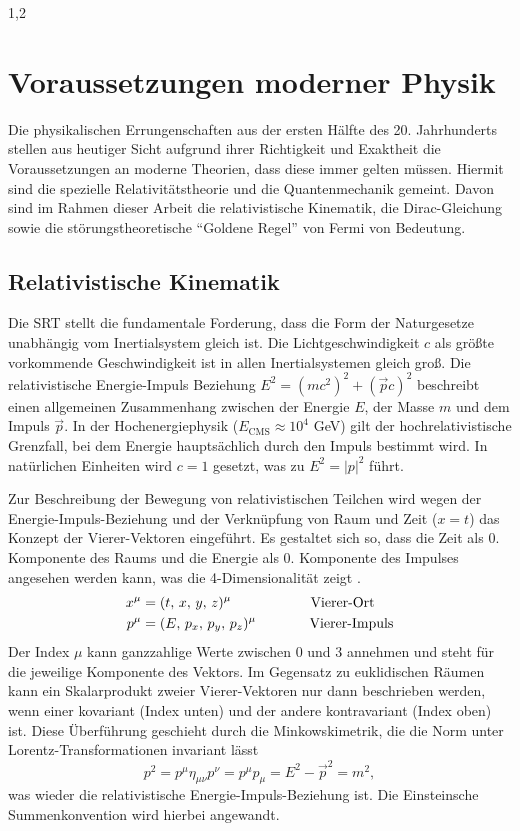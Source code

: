 \documentclass[11pt,a4paper,twoside]{report}
\begin{document}
\begin{spacing}{1,2}
\section{Voraussetzungen moderner Physik}
Die physikalischen Errungenschaften aus der ersten Hälfte des 20. Jahrhunderts stellen aus heutiger Sicht aufgrund ihrer Richtigkeit und Exaktheit die 
Voraussetzungen an moderne 
Theorien, dass diese immer gelten müssen. Hiermit sind die spezielle Relativitätstheorie und die Quantenmechanik gemeint. Davon sind im Rahmen dieser 
Arbeit die relativistische Kinematik, die Dirac-Gleichung sowie die störungstheoretische ``Goldene Regel'' von Fermi
von Bedeutung.

\subsection{Relativistische Kinematik}
Die SRT stellt die fundamentale Forderung, dass die Form der Naturgesetze unabhängig vom Inertialsystem gleich ist. Die Lichtgeschwindigkeit $c$ als
größte vorkommende Geschwindigkeit ist in allen Inertialsystemen gleich groß. Die relativistische Energie-Impuls Beziehung 
$E^2 = \left(mc^2\right)^2 + \left(\vec pc\right)^2$ beschreibt einen allgemeinen Zusammenhang zwischen der Energie $E$, der Masse $m$ und dem Impuls $\vec p$.
In der Hochenergiephysik ($E_{\text{CMS}} \approx 10^4$ GeV) gilt der hochrelativistische Grenzfall, bei dem Energie hauptsächlich durch den Impuls bestimmt wird.
In natürlichen Einheiten wird $c = 1$ gesetzt, was zu $E^2 = \left|p\right|^2$ führt.

Zur Beschreibung der Bewegung von relativistischen Teilchen wird wegen der Energie-Impuls-Beziehung und der Verknüpfung von Raum und Zeit ($x = t$) das Konzept
der Vierer-Vektoren eingeführt. Es gestaltet sich so, dass die Zeit als 0. Komponente des Raums und die Energie als 0. Komponente des Impulses angesehen werden
kann, was die 4-Dimensionalität zeigt \cite{RelKin}.
\begin{align}
 x^\mu &= (t,\,x,\,y,\,z)^\mu \hspace{2cm} \text{Vierer-Ort}\\
 p^\mu &= (E,\,p_x,\,p_y,\,p_z)^\mu \hspace{1.35cm} \text{Vierer-Impuls}
\end{align}
Der Index $\mu$ kann ganzzahlige Werte zwischen 0 und 3 annehmen und steht für die jeweilige Komponente des Vektors. Im Gegensatz zu euklidischen Räumen 
kann ein Skalarprodukt zweier Vierer-Vektoren nur dann beschrieben werden, wenn einer kovariant (Index unten) und der andere kontravariant (Index oben) ist.
Diese Überführung geschieht durch die Minkowskimetrik, die die Norm unter Lorentz-Transformationen invariant lässt
\begin{equation}
  p^2 = p^\mu \eta_{\mu \nu} p^\nu = p^\mu p_\mu = E^2 - \vec p^2 = m^2,
\end{equation}
was wieder die relativistische Energie-Impuls-Beziehung ist. Die Einsteinsche Summenkonvention wird hierbei angewandt.

\end{spacing}
\end{document}
